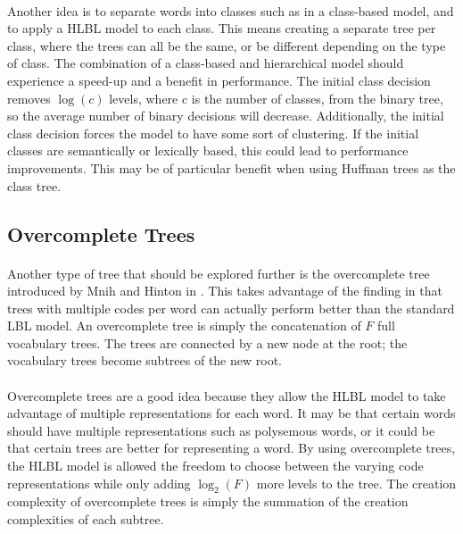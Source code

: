 \paragraph{}
Another idea is to separate words into classes such as in a class-based model, and to apply a HLBL model to each class. This means creating a separate tree per class, where the trees can all be the same, or be different depending on the type of class. The combination of a class-based and hierarchical model should experience a speed-up and a benefit in performance. The initial class decision removes $\log(c)$ levels, where c is the number of classes, from the binary tree, so the average number of binary decisions will decrease. Additionally, the initial class decision forces the model to have some sort of clustering. If the initial classes are semantically or lexically based, this could lead to performance improvements. This may be of particular benefit when using Huffman trees as the class tree.


\subsection{Overcomplete Trees}
\paragraph{}
Another type of tree that should be explored further is the overcomplete tree introduced by Mnih and Hinton in \cite{MnihHinton2009}. This takes advantage of the finding in \cite{MnihHinton2009} that trees with multiple codes per word can actually perform better than the standard LBL model. An overcomplete tree is simply the concatenation of $F$ full vocabulary trees. The trees are connected by a new node at the root; the vocabulary trees become subtrees of the new root. 
\paragraph{}
Overcomplete trees are a good idea because they allow the HLBL model to take advantage of multiple representations for each word. It may be that certain words should have multiple representations such as polysemous words, or it could be that certain trees are better for representing a word. By using overcomplete trees, the HLBL model is allowed the freedom to choose between the varying code representations while only adding $\log_2(F)$ more levels to the tree. The creation complexity of overcomplete trees is simply the summation of the creation complexities of each subtree.
